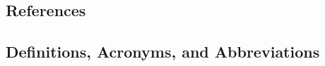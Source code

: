 \subsection{References}

\renewcommand{\refname}{}


\subsection{Definitions, Acronyms, and Abbreviations \label{sect:acronyms}}

